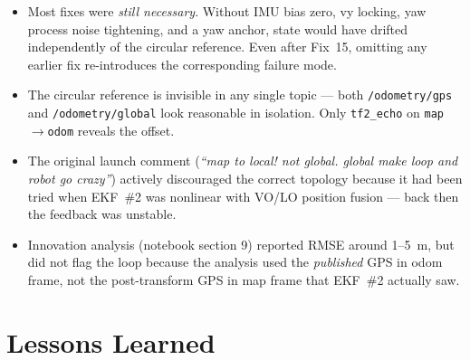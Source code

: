 \documentclass[11pt,a4paper]{article}
\begin{document}
\begin{itemize}[noitemsep]
\item Most fixes were \emph{still necessary}. Without IMU bias zero, vy locking,
yaw process noise tightening, and a yaw anchor, state would have drifted independently
of the circular reference. Even after Fix~15, omitting any earlier fix re-introduces
the corresponding failure mode.
\item The circular reference is invisible in any single topic --- both \texttt{/odometry/gps}
and \texttt{/odometry/global} look reasonable in isolation. Only \texttt{tf2\_echo} on
\texttt{map$\to$odom} reveals the offset.
\item The original launch comment (\textit{``map to local! not global. global make loop and
robot go crazy''}) actively discouraged the correct topology because it had been tried
when EKF~\#2 was nonlinear with VO/LO position fusion --- back then the feedback was
unstable.
\item Innovation analysis (notebook section 9) reported RMSE around 1--5~m, but did not
flag the loop because the analysis used the \emph{published} GPS in odom frame, not the
post-transform GPS in map frame that EKF~\#2 actually saw.
\end{itemize}

\section{Lessons Learned}
\end{document}
